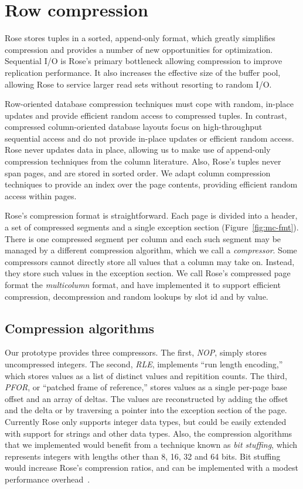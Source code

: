 \documentclass{vldb}
\newcommand{\rows}{Rose\xspace}
\newcommand{\rowss}{Rose's\xspace}
\begin{document}
\section{Row compression}

\rows stores tuples in a sorted, append-only format, which greatly
simplifies compression and provides a number of new opportunities for
optimization.  Sequential I/O is \rowss primary bottleneck allowing
compression to improve replication performance.  It also
increases the effective size of the buffer pool, allowing \rows to
service larger read sets without resorting to random I/O.

Row-oriented database compression techniques must cope with random,
in-place updates and provide efficient random access to compressed
tuples.  In contrast, compressed column-oriented database layouts
focus on high-throughput sequential access and do not provide in-place
updates or efficient random access.  \rows never updates data in
place, allowing us to make use of append-only compression techniques
from the column literature.  Also, \rowss tuples never span pages, and
are stored in sorted order.  We adapt column compression techniques to provide an
index over the page contents, providing efficient random access within
pages.

\rowss compression format is straightforward.  Each page is divided into
a header, a set of compressed segments and a single exception section
(Figure~\ref{fig:mc-fmt}).  There is one compressed segment per column
and each such segment may be managed by a different compression
algorithm, which we call a {\em compressor}.  Some compressors cannot
directly store all values that a column may take on.  Instead, they
store such values in the exception section.  We call
\rowss compressed page format the {\em multicolumn} format, and have
implemented it to support efficient compression,
decompression and random lookups by slot id and by value.

\subsection{Compression algorithms}
Our prototype provides three compressors.  The first, {\em NOP},
simply stores uncompressed integers.  The second, {\em RLE},
implements ``run length encoding,'' which stores values as a list of
distinct values and repitition counts.  The third, {\em PFOR}, or
``patched frame of reference,'' stores values as a single per-page
base offset and an array of deltas.  The values are reconstructed by
adding the offset and the delta or by traversing a pointer into the
exception section of the page.  Currently \rows only supports integer
data types, but could be easily extended with support for strings and
other data types.  Also, the compression algorithms that we
implemented would benefit from a technique known as {\em bit stuffing},
which represents integers with lengths other than 8, 16, 32 and 64
bits.  Bit stuffing would increase \rowss compression ratios,
and can be implemented with a modest performance overhead~\cite{pfor}.
\end{document}
